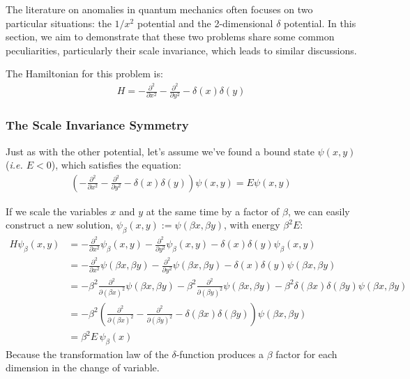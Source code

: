 The literature on anomalies in quantum mechanics often focuses on two particular situations: the $1/x^2$ potential and the 2-dimensional $\delta$ potential. In this section, we aim to demonstrate that these two problems share some common peculiarities, particularly their scale invariance, which leads to similar discussions.

\vspace{4mm}
\noindent
The Hamiltonian for this problem is: 
\begin{align*}
    H = - \frac{\partial^2}{\partial x^2} - \frac{\partial^2}{\partial y^2} - \delta(x) \delta(y)
\end{align*}

\subsubsection*{The Scale Invariance Symmetry}

Just as with the other potential, let's assume we've found a bound state $\psi(x,y)$ (\textit{i.e. $E < 0$}), which satisfies the equation:
\begin{align*}
    \left(- \frac{\partial^2}{\partial x^2} - \frac{\partial^2}{\partial y^2} - \delta(x) \delta(y)\right)\psi(x,y) = E\psi(x,y)
\end{align*}

\clearpage

\noindent
If we scale the variables $x$ and $y$ at the same time by a factor of $\beta$, we can easily construct a new solution, $\psi_\beta(x,y) := \psi(\beta x, \beta y)$, with energy $\beta^2 E$:
\begin{align*}
     H \psi_\beta (x,y)
     & = - \frac{\partial^2}{\partial x^2}\psi_\beta(x,y) - \frac{\partial^2}{\partial y^2}\psi_\beta(x,y) - \delta(x) \delta(y)\psi_\beta(x,y) \\
     & = - \frac{\partial^2}{\partial x^2}\psi(\beta x, \beta y) - \frac{\partial^2}{\partial y^2}\psi(\beta x, \beta y) - \delta(x) \delta(y)\psi(\beta x, \beta y) \\
     & = - \beta^2 \frac{\partial^2}{\partial (\beta x)^2}\psi(\beta x, \beta y) - \beta^2 \frac{\partial^2}{\partial (\beta y)^2}\psi(\beta x, \beta y) - \beta^2 \delta(\beta x) \delta(\beta y)\psi(\beta x, \beta y) \\
     & = - \beta^2 \left(\frac{\partial^2}{\partial (\beta x)^2} - \frac{\partial^2}{\partial (\beta y)^2} -  \delta(\beta x) \delta(\beta y)\right)\psi(\beta x, \beta y) \\
     & = \beta^2 E \, \psi_\beta (x)
\end{align*}
Because the transformation law of the $\delta$-function produces a $\beta$ factor for each dimension in the change of variable.

